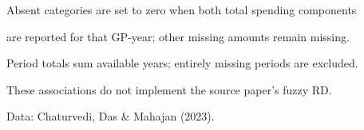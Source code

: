 \begin{table}
\begin{threeparttable}
\begin{tablenotes}[flushleft]
\item[] Absent categories are set to zero when both total spending components
\item[] are reported for that GP-year; other missing amounts remain missing.
\item[] Period totals sum available years; entirely missing periods are excluded.
\item[] These associations do not implement the source paper's fuzzy RD.
\item[] Data: Chaturvedi, Das \& Mahajan (2023).
\end{tablenotes}
\end{threeparttable}
\end{table}
